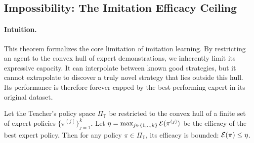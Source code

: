 \subsection{Impossibility: The Imitation Efficacy Ceiling}
\paragraph{Intuition.} This theorem formalizes the core limitation of imitation learning. By restricting an agent to the convex hull of expert demonstrations, we inherently limit its expressive capacity. It can interpolate between known good strategies, but it cannot extrapolate to discover a truly novel strategy that lies outside this hull. Its performance is therefore forever capped by the best-performing expert in its original dataset.

\begin{theorem}
\label{thm:imitation_ceiling}
Let the Teacher's policy space $\Pi_{\mathbb{T}}$ be restricted to the convex hull of a finite set of expert policies $\{\pi^{(j)}\}_{j=1}^k$. Let $\eta = \max_{j \in \{1,..,k\}} \mathcal{E}(\pi^{(j)})$ be the efficacy of the best expert policy. Then for any policy $\pi \in \Pi_{\mathbb{T}}$, its efficacy is bounded: $\mathcal{E}(\pi) \le \eta$.
\end{theorem}
